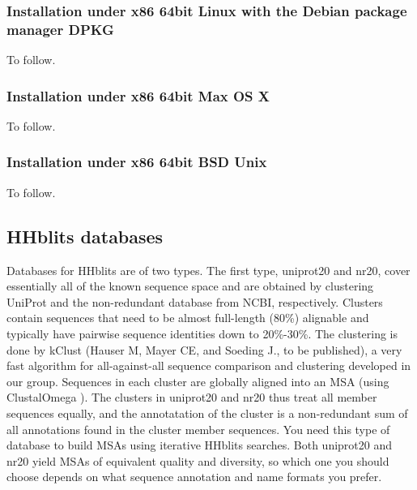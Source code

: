 \documentclass[11pt,a4paper]{article}
\begin{document}
\subsubsection*{Installation under x86 64bit Linux with the Debian package manager DPKG}

To follow.


\subsubsection*{Installation under x86 64bit Max OS X}

To follow.


\subsubsection*{Installation under x86 64bit BSD Unix}

To follow.


\subsection{HHblits databases} \label{hhblits_dbs}
Databases for HHblits are of two types. The first type, uniprot20 and nr20, cover essentially all of the known sequence space and are obtained by clustering UniProt \cite{uniprot:2010} and the non-redundant database from NCBI, respectively. Clusters  contain sequences that need to be almost full-length (80\%) alignable and typically have pairwise sequence identities down to 20\%-30\%. The clustering is done by kClust (Hauser M, Mayer CE, and Soeding J., to be published), a very fast algorithm for all-against-all sequence comparison and clustering developed in our group. Sequences in each cluster are globally aligned into an MSA (using ClustalOmega \cite{Higgins:2011}). The clusters in uniprot20 and nr20 thus treat all member sequences equally, and the annotatation of the cluster is a non-redundant sum of all annotations found in the cluster member sequences. You need this type of database to build MSAs using iterative HHblits searches. Both uniprot20 and nr20 yield MSAs of equivalent quality and diversity, so which one you should choose depends on what sequence annotation and name formats you prefer. 
\end{document}
